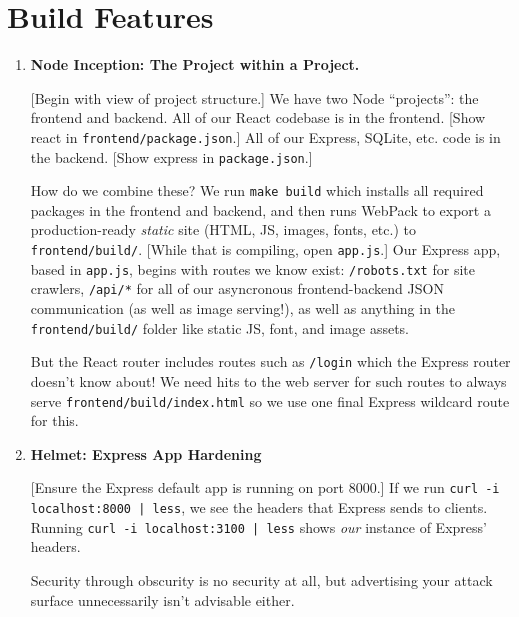 \documentclass[12pt]{article}
\begin{document}
\section{Build Features}
\begin{enumerate}[label={(\arabic*)}]
	\item {\bfseries {\sffamily Node} Inception: The Project within a Project.}
		
		[Begin with view of project structure.] We have two {\sffamily Node} ``projects'': the frontend and backend. All of our {\sffamily React} codebase is in the frontend. [Show {\ttfamily react} in \verb|frontend/package.json|.] All of our {\sffamily Express}, {\sffamily SQLite}, etc. code is in the backend. [Show {\ttfamily express} in \verb|package.json|.] 

		How do we combine these? We run \verb|make build| which installs all required packages in the frontend and backend, and then runs WebPack to export a production-ready {\em static} site (HTML, JS, images, fonts, etc.) to \verb|frontend/build/|. [While that is compiling, open \verb|app.js|.]
		Our {\sffamily Express} app, based in \verb|app.js|, begins with routes we know exist: \verb|/robots.txt| for site crawlers, \verb|/api/*| for all of our asyncronous frontend-backend JSON communication (as well as image serving!), as well as anything in the \verb|frontend/build/| folder like static JS, font, and image assets.

		But the {\sffamily React} router includes routes such as \verb|/login| which the {\sffamily Express} router doesn't know about! We need hits to the web server for such routes to always serve \verb|frontend/build/index.html| so we use one final {\sffamily Express} wildcard route for this.



	\item {\bfseries {\sffamily Helmet}: Express App Hardening}

		[Ensure the {\sffamily Express} default app is running on port 8000.] If we run \verb!curl -i localhost:8000 | less!, we see the headers that {\sffamily Express} sends to clients. Running \verb!curl -i localhost:3100 | less! shows {\em our} instance of {\sffamily Express}' headers.

		Security through obscurity is no security at all, but advertising your attack surface unnecessarily isn't advisable either.



\end{enumerate}
\end{document}
